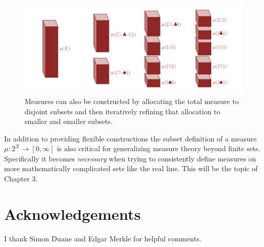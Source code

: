 \documentclass[
  letterpaper,
  DIV=11,
  numbers=noendperiod]{scrartcl}
\begin{document}
\begin{figure}

{\centering \includegraphics[width=1\textwidth,height=\textheight]{figures/decompositions/refinement/refinement.pdf}

}

\caption{\label{fig-refinement}Measures can also be constructed by
allocating the total measure to disjoint subsets and then iteratively
refining that allocation to smaller and smaller subsets.}

\end{figure}

In addition to providing flexible constructions the subset definition of
a measure \(\mu : 2^{X} \rightarrow [0, \infty]\) is also critical for
generalizing measure theory beyond finite sets. Specifically it becomes
\emph{necessary} when trying to consistently define measures on more
mathematically complicated sets like the real line. This will be the
topic of Chapter 3.

\hypertarget{acknowledgements}{%
\section{Acknowledgements}\label{acknowledgements}}

I thank Simon Duane and Edgar Merkle for helpful comments.
\end{document}

